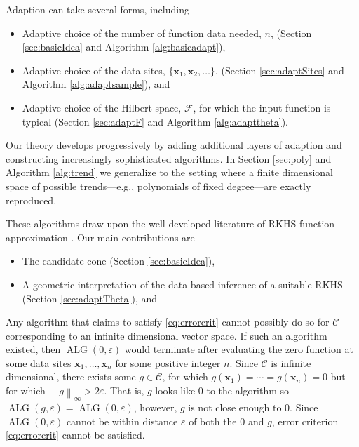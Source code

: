 \documentclass[]{mcom-l}
\theoremstyle{plain}
\theoremstyle{definition}
\DeclareMathOperator{\ALG}{ALG}
\newcommand{\bx}{{\boldsymbol{x}}}
\newcommand{\cc}{\mathcal{C}}
\newcommand{\calf}{{\mathcal{F}}}
\newcommand{\norm}[2][{}]{\ensuremath{\left \lVert #2 \right \rVert}_{#1}}
\begin{document}
Adaption can take several forms, including
\begin{itemize}
    \item Adaptive choice of the number of function data needed, $n$, (Section \ref{sec:basicIdea} and Algorithm \ref{alg:basicadapt}),
    \item Adaptive choice of the data sites, $\{\bx_1, \bx_2, \ldots\}$,  (Section \ref{sec:adaptSites} and Algorithm \ref{alg:adaptsample}), and
    \item Adaptive choice of the Hilbert space, $\calf$, for which the input function is typical  (Section \ref{sec:adaptF} and Algorithm \ref{alg:adapttheta}).
\end{itemize}
Our theory develops progressively by adding additional layers of adaption and constructing increasingly sophisticated algorithms.  In Section \ref{sec:poly} and Algorithm \ref{alg:trend} we generalize to the setting where a finite dimensional space of possible trends---e.g., polynomials of fixed degree---are exactly reproduced.

These algorithms draw upon the well-developed literature of RKHS function approximation \cite{Buh03a,Fas07a,FasMcC15a,ForFly15a,ForEtal09,RasWil06a,SchWen06a,Wah85a,Wen05a}.  Our main contributions are 
\begin{itemize}
	\item The candidate cone (Section \ref{sec:basicIdea}),
	\item A geometric interpretation of the data-based inference of a suitable RKHS (Section  \ref{sec:adaptTheta}), and
\end{itemize}

Any algorithm that claims to satisfy \eqref{eq:errorcrit} cannot possibly do so for $\cc$ corresponding to an infinite dimensional vector space.  If such an algorithm existed, then $\ALG(0,\varepsilon)$ would terminate after evaluating the zero function at some data sites $\bx_1, \ldots, \bx_n$ for some positive integer $n$.  Since $\cc$ is infinite dimensional, there exists some $g \in \cc$, for which $g(\bx_1) = \cdots = g(\bx_n) = 0$ but for which $\norm[\infty]{g} > 2 \varepsilon$.  That is, $g$ looks like  $0$ to the algorithm so $\ALG(g,\varepsilon) = \ALG(0,\varepsilon)$, however, $g$ is not close enough to $0$.   Since $\ALG(0,\varepsilon)$ cannot be within distance $\varepsilon$ of both the $0$ and $g$, error criterion \eqref{eq:errorcrit} cannot be satisfied.
\end{document}
